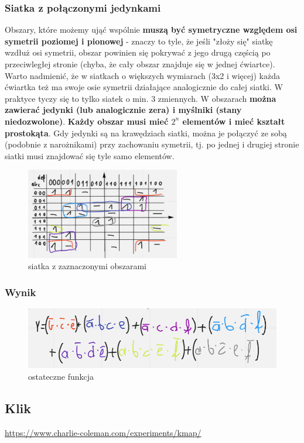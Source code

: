 \newpage

\subsubsection{Siatka z połączonymi jedynkami}

Obszary, które możemy ująć wspólnie \textbf{muszą być symetryczne względem osi symetrii poziomej i pionowej} - znaczy to tyle, że jeśli "złoży się" siatkę wzdłuż osi symetrii, obszar powinien się pokrywać z jego drugą częścią po przeciwległej stronie (chyba, że cały obszar znajduje się w jednej ćwiartce). Warto nadmienić, że w siatkach o większych wymiarach (3x2 i więcej) każda ćwiartka też ma swoje osie symetrii działające analogicznie do całej siatki. W praktyce tyczy się to tylko siatek o min. 3 zmiennych. W obszarach \textbf{można zawierać jedynki (lub analogicznie zera) i myślniki (stany niedozwolone)}. \textbf{Każdy obszar musi mieć $2^n$ elementów i mieć kształt prostokąta}. Gdy jedynki są na krawędziach siatki, można je połączyć ze sobą (podobnie z narożnikami) przy zachowaniu symetrii, tj. po jednej i drugiej stronie siatki musi znajdować się tyle samo elementów.

\begin{figure}[h!]
    \centering
    \includegraphics[width=0.6\textwidth]{images/karnaugh/k_t2.png}
    \caption{siatka z zaznaczonymi obszarami}
    \label{fig:my_label}
\end{figure}

\subsubsection{Wynik}

\begin{figure}[h!]
    \centering
    \includegraphics[width=.6\textwidth]{images/karnaugh/k_r.png}
    \caption{ostateczne funkcja}
    \label{fig:my_label}
\end{figure}

\subsection{Klik}

\url{https://www.charlie-coleman.com/experiments/kmap/}